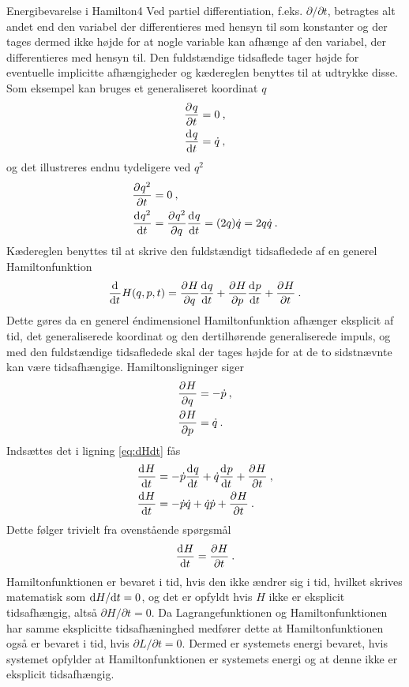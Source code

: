 %
%
\begin{opgave}{Energibevarelse i Hamilton}{4}
\opg Ved partiel differentiation, f.eks. $\partial/\partial t$, betragtes alt andet end den variabel der differentieres med hensyn til som konstanter og der tages dermed ikke højde for at nogle variable kan afhænge af den variabel, der differentieres med hensyn til. Den fuldstændige tidsaflede tager højde for eventuelle implicitte afhængigheder og kædereglen benyttes til at udtrykke disse. Som eksempel kan bruges et generaliseret koordinat $q$
\begin{align*}
	\pdif{t}{q} &= 0 \: , \\
	\dif{t}{q} &= \dt{q} \: ,
\end{align*}
og det illustreres endnu tydeligere ved $q^2$
\begin{align*}
	\pdif{t}{q^2} &= 0 \: ,\\
	\dif{t}{q^2} &= \pdif{q}{q^2}\dif{t}{q} = (2q)\dt{q} = 2q\dt{q} \: .
\end{align*}
\opg Kædereglen benyttes til at skrive den fuldstændigt tidsafledede af en generel Hamiltonfunktion
\begin{align} \label{eq:dHdt}
	\dif{t}{}H(q,p,t) = \pdif{q}{H}\dif{t}{q} + \pdif{p}{H}\dif{t}{p} + \pdif{t}{H} \: .
\end{align}
Dette gøres da en generel éndimensionel Hamiltonfunktion afhænger eksplicit af tid, det generaliserede koordinat og den dertilhørende generaliserede impuls, og med den fuldstændige tidsafledede skal der tages højde for at de to sidstnævnte kan være tidsafhængige.
\opg Hamiltonsligninger siger
\begin{align*}
	\pdif{q}{H} &=  -\dt{p} \: , \\
	\pdif{p}{H} &=  \dt{q} \: .
\end{align*}
Indsættes det i ligning \eqref{eq:dHdt} fås
\begin{align*}
	\dif{t}{H} &= -\dt{p}\dif{t}{q} + \dt{q}\dif{t}{p} + \pdif{t}{H} \: , \\
	\dif{t}{H} &= -\dt{p}\dt{q} + \dt{q}\dt{p} + \pdif{t}{H} \: .
\end{align*}
\opg Dette følger trivielt fra ovenstående spørgsmål
\begin{align*}
	\dif{t}{H} = \pdif{t}{H} \: .
\end{align*}
\opg Hamiltonfunktionen er bevaret i tid, hvis den ikke ændrer sig i tid, hvilket skrives matematisk som $\d H/\d t = 0$, og det er opfyldt hvis $H$ ikke er eksplicit tidsafhængig, altså $\partial H/\partial t = 0$. Da Lagrangefunktionen og Hamiltonfunktionen har samme eksplicitte tidsafhæninghed medfører dette at Hamiltonfunktionen også er bevaret i tid, hvis $\partial L/\partial t = 0$. Dermed er systemets energi bevaret, hvis systemet opfylder at Hamiltonfunktionen er systemets energi og at denne ikke er eksplicit tidsafhængig.

\end{opgave}
